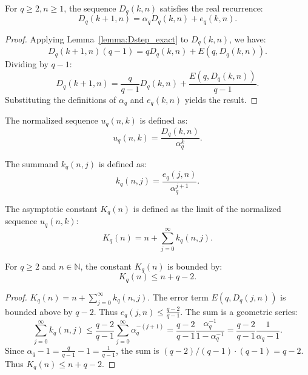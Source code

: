 \begin{lemma}
  \label{lemma:Diter'_real_recurrence}
  \leanok
  For $q \ge 2, n \ge 1$, the sequence $D_q(k, n)$ satisfies the real recurrence:
  \[ D_q(k+1, n) = \alpha_q D_q(k, n) + e_q(k, n). \]
  \begin{proof}
    \leanok
    Applying Lemma~\ref{lemma:Dstep_exact} to $D_q(k, n)$, we have:
    \[ D_q(k+1, n) (q - 1) = q D_q(k, n) + E(q, D_q(k, n)). \]
    Dividing by $q-1$:
    \[ D_q(k+1, n) = \frac{q}{q-1} D_q(k, n) + \frac{E(q, D_q(k, n))}{q-1}. \]
    Substituting the definitions of $\alpha_q$ and $e_q(k, n)$ yields the result.
  \end{proof}
\end{lemma}

\begin{definition}
  \label{def:u_seq}
  \leanok
  The normalized sequence $u_q(n, k)$ is defined as:
  \[ u_q(n, k) = \frac{D_q(k, n)}{\alpha_q^k}. \]
\end{definition}

\begin{definition}
  \label{def:K_summand}
  \leanok
  The summand $k_q(n, j)$ is defined as:
  \[ k_q(n, j) = \frac{e_q(j, n)}{\alpha_q^{j+1}}. \]
\end{definition}

\begin{definition}
  \label{def:K_const}
  \leanok
  The asymptotic constant $K_q(n)$ is defined as the limit of the normalized sequence $u_q(n, k)$:
  \[ K_q(n) = n + \sum_{j=0}^{\infty} k_q(n, j). \]
\end{definition}

\begin{lemma}
  \label{lemma:K_const_le}
  \leanok
  For $q \ge 2$ and $n \in \mathbb{N}$, the constant $K_q(n)$ is bounded by:
  \[ K_q(n) \le n + q - 2. \]
  \begin{proof}
    \leanok
    $K_q(n) = n + \sum_{j=0}^{\infty} k_q(n, j)$.
    The error term $E(q, D_q(j, n))$ is bounded above by $q-2$. Thus $e_q(j, n) \le \frac{q-2}{q-1}$.
    The sum is a geometric series:
    \[ \sum_{j=0}^{\infty} k_q(n, j) \le \frac{q-2}{q-1} \sum_{j=0}^{\infty} \alpha_q^{-(j+1)} = \frac{q-2}{q-1} \frac{\alpha_q^{-1}}{1 - \alpha_q^{-1}} = \frac{q-2}{q-1} \frac{1}{\alpha_q - 1}. \]
    Since $\alpha_q - 1 = \frac{q}{q-1} - 1 = \frac{1}{q-1}$, the sum is $(q-2)/(q-1) \cdot (q-1) = q-2$.
    Thus $K_q(n) \le n + q - 2$.
  \end{proof}
\end{lemma}

